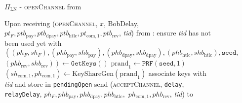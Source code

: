 \begin{figure}[!htbp]
  \begin{protocolbox}{$\Pi_{\mathrm{LN}}$ - \textsc{openChannel} from \bob}
    \begin{algorithmic}[1]
      \State Upon receiving (\textsc{openChannel}, $x$, BobDelay, $pt_F,
      ptb_{\mathrm{pay}}, ptb_{\mathrm{dpay}}, ptb_{\mathrm{htlc}},
      pt_{\mathrm{com}, 1}, ptb_{\mathrm{rev}}$, \textit{tid}) from \bob:
      \Indent
        \State ensure \textit{tid} has not been used yet with \bob
        \State $\left(\left(ph_F, sh_F\right), \left(phb_{\mathrm{pay}},
        shb_{\mathrm{pay}}\right), \left(phb_{\mathrm{dpay}},
        shb_{\mathrm{dpay}}\right), \left(phb_{\mathrm{htlc}},
        shb_{\mathrm{htlc}}\right), \mathtt{seed},\right.$
        $\left.\left(phb_{\mathrm{rev}}, shb_{\mathrm{rev}}\right)\right) \gets
        \texttt{GetKeys}\left(\right)$
        \State $\mathrm{prand}_1 \gets \texttt{PRF}\left(\mathtt{seed},
        1\right)$
        \State $\left(sh_{\mathrm{com}, 1}, ph_{\mathrm{com}, 1}\right) \gets
        \mathrm{KeyShareGen}\left(\mathrm{prand}_1\right)$
        \State associate keys with \textit{tid} and store in
        \texttt{pendingOpen}
        \State send (\textsc{acceptChannel}, \texttt{delay},
        \texttt{relayDelay}, $ph_F, phb_{\mathrm{pay}}, phb_{\mathrm{dpay}},
        phb_{\mathrm{htlc}},$ $ph_{\mathrm{com}, 1}, phb_{\mathrm{rev}}$,
        \textit{tid}) to \bob{}
      \EndIndent
    \end{algorithmic}
  \end{protocolbox}
  \caption{}
  \label{alg:protocol:open:openChannel}
\end{figure}

